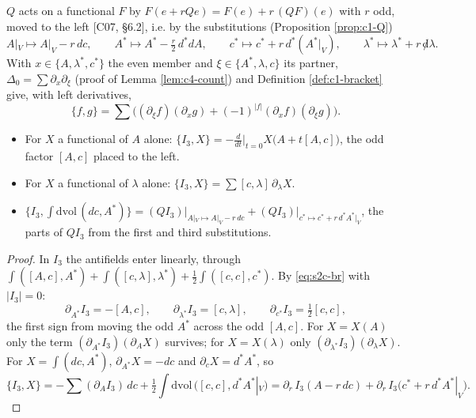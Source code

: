\begin{definition}
\label{def:s2c-ops}
$Q$ acts on a functional $F$ by $F(e+rQe)=F(e)+r\,(QF)(e)$ with $r$ odd, moved to the left [C07, §6.2], i.e. by the substitutions (Proposition \ref{prop:c1-Q})
\[
A|_V\mapsto A|_V-r\,dc,\qquad A^*\mapsto A^*-\tfrac r2\,d^*dA,\qquad c^*\mapsto c^*+r\,d^*(A^*|_V),\qquad \lambda^*\mapsto\lambda^*+r\,{\not d}\lambda .
\]
With $x\in\{A,\lambda^*,c^*\}$ the even member and $\xi\in\{A^*,\lambda,c\}$ its partner, $\Delta_0=\sum\partial_x\partial_\xi$ (proof of Lemma \ref{lem:c4-count}) and Definition \ref{def:c1-bracket} give, with left derivatives,
\begin{equation}
\{f,g\}=\sum\Big((\partial_\xi f)(\partial_xg)+(-1)^{|f|}(\partial_xf)(\partial_\xi g)\Big).
\label{eq:s2c-br}
\end{equation}
\end{definition}

\begin{lemma}
\label{lem:s2c-brrules}
\begin{itemize}
\item For $X$ a functional of $A$ alone: $\{I_3,X\}=-\frac{d}{dt}\Big|_{t=0}X\big(A+t[A,c]\big)$, the odd factor $[A,c]$ placed to the left.
\item For $X$ a functional of $\lambda$ alone: $\{I_3,X\}=\sum[c,\lambda]\,\partial_\lambda X$.
\item $\{I_3,\int\mathrm{dvol}\,(dc,A^*)\}=(QI_3)\big|_{A|_V\mapsto A|_V-r\,dc}+(QI_3)\big|_{c^*\mapsto c^*+r\,d^*A^*|_V}$, the parts of $QI_3$ from the first and third substitutions.
\end{itemize}
\end{lemma}

\begin{proof}
In $I_3$ the antifields enter linearly, through $\int([A,c],A^*)+\int([c,\lambda],\lambda^*)+\tfrac12\int([c,c],c^*)$. By \eqref{eq:s2c-br} with $|I_3|=0$:
\[
\partial_{A^*}I_3=-[A,c],\qquad \partial_{\lambda^*}I_3=[c,\lambda],\qquad \partial_{c^*}I_3=\tfrac12[c,c],
\]
the first sign from moving the odd $A^*$ across the odd $[A,c]$. For $X=X(A)$ only the term $(\partial_{A^*}I_3)(\partial_AX)$ survives; for $X=X(\lambda)$ only $(\partial_{\lambda^*}I_3)(\partial_\lambda X)$. For $X=\int(dc,A^*)$, $\partial_{A^*}X=-dc$ and $\partial_cX=d^*A^*$, so
\[
\{I_3,X\}=-\sum(\partial_AI_3)\,dc+\tfrac12\int\mathrm{dvol}\,([c,c],d^*A^*|_V)=\partial_r\,I_3(A-r\,dc)+\partial_r\,I_3\big(c^*+r\,d^*A^*|_V\big).
\]
\end{proof}

